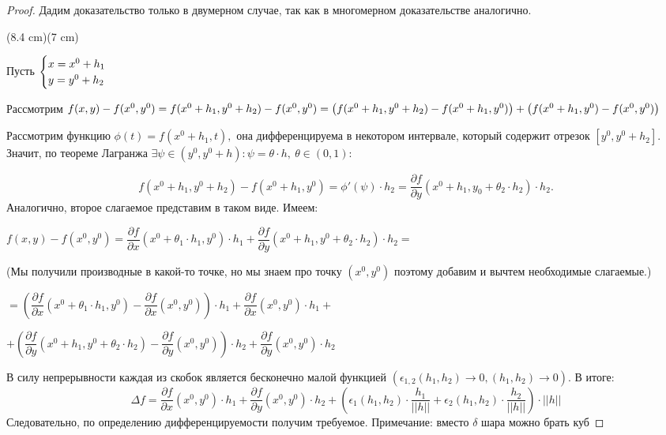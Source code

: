 \begin{proof}
    Дадим доказательство только в двумерном случае, так как в многомерном доказательстве аналогично.
    
    \sidefig(8.4 cm)(7 cm)
    {
    \begin{flushleft}
    \normalsize Пусть
        $
            \begin{cases}
                x = x^{0} + h_{1}\\
                y = y^{0} + h_{2}
            \end{cases}\hfill\newline
        $
        
        \normalsize Рассмотрим
        $f(x, y) - f(x^0, y^0) = f(x^0 + h_1, y^0 + h_2) - f(x^0, y^0) = \left( f(x^0 + h_1, y^0 + h_2) - f(x^0 + h_1, y^0) \right) + \left( f(x^0 + h_1, y^0) - f(x^0, y^0) \right)\newline$
    \end{flushleft}
    }
    {
    
    }

    Рассмотрим функцию $\phi(t) = f(x^0 + h_1, t),$ она дифференцируема в некотором интервале, который содержит отрезок $[y^0, y^0 + h_2].$ Значит, по теореме Лагранжа
$\exists \psi \in (y^0, y^0 + h): \psi = \theta \cdot h, \  \theta \in (0, 1)$:
    
    $$f(x^0 + h_1, y^0 + h_2) - f(x^0 + h_1, y^0) = \phi'(\psi) \cdot h_2 = \dfrac{\partial f}{\partial y} (x^0 + h_1, y_0 + \theta_2 \cdot h_2) \cdot h_2.$$
    Аналогично, второе слагаемое представим в таком виде. Имеем:
    
    $f(x, y) - f(x^0, y^0) = \dfrac{\partial f}{\partial x} (x^0 + \theta_1 \cdot h_1, y^0) \cdot h_1 + \dfrac{\partial f}{\partial y} (x^0 + h_1, y^0 + \theta_2 \cdot h_2) \cdot h_2 = $
    
    (Мы получили производные в какой-то точке, но мы знаем про точку $(x^0, y^0)$ поэтому добавим и вычтем необходимые слагаемые.)
    
    $ = \left( \dfrac{\partial f}{\partial x} (x^0 + \theta_1 \cdot h_1, y^0) - \dfrac{\partial f}{\partial x} (x^0, y^0) \right) \cdot h_1 + \dfrac{\partial f}{\partial x} (x^0, y^0) \cdot h_1 +  $
    \begin{flushright}
            $+ \left( \dfrac{\partial f}{\partial y} (x^0 + h_1, y^0 + \theta_2 \cdot h_2) - \dfrac{\partial f}{\partial y} (x^0, y^0)\right) \cdot h_2 + \dfrac{\partial f}{\partial y} (x^0, y^0) \cdot h_2$
    \end{flushright}


    В силу непрерывности каждая из скобок является бесконечно малой функцией $(\epsilon_{1, 2}(h_1, h_2) \to 0, (h_1, h_2) \to 0)$. В итоге:
    $$\Delta f = \dfrac{\partial f}{\partial x} (x^0, y^0) \cdot h_1 + \dfrac{\partial f}{\partial y} (x^0, y^0) \cdot h_2 + \left( \epsilon_1(h_1, h_2) \cdot \frac{h_1}{||h||} + \epsilon_2(h_1,h_2) \cdot \frac{h_2}{||h||}\right) \cdot ||h||$$
    Следовательно, по определению дифференцируемости получим требуемое.
    Примечание: вместо $\delta$ шара можно брать куб
\end{proof}

